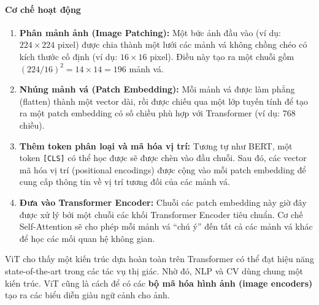 \paragraph{Cơ chế hoạt động}
\begin{enumerate}
    \item \textbf{Phân mảnh ảnh (Image Patching):} Một bức ảnh đầu vào (ví dụ: $224 \times 224$ pixel) được chia thành một lưới các mảnh vá không chồng chéo có kích thước cố định (ví dụ: $16 \times 16$ pixel). Điều này tạo ra một chuỗi gồm $(224/16)^2 = 14 \times 14 = 196$ mảnh vá.
    \item \textbf{Nhúng mảnh vá (Patch Embedding):} Mỗi mảnh vá được làm phẳng (flatten) thành một vector dài, rồi được chiếu qua một lớp tuyến tính để tạo ra một patch embedding có số chiều phù hợp với Transformer (ví dụ: 768 chiều).
    \item \textbf{Thêm token phân loại và mã hóa vị trí:} Tương tự như BERT, một token \texttt{[CLS]} có thể học được sẽ được chèn vào đầu chuỗi. Sau đó, các vector mã hóa vị trí (positional encodings) được cộng vào mỗi patch embedding để cung cấp thông tin về vị trí tương đối của các mảnh vá.
    \item \textbf{Đưa vào Transformer Encoder:} Chuỗi các patch embedding này giờ đây được xử lý bởi một chuỗi các khối Transformer Encoder tiêu chuẩn. Cơ chế Self-Attention sẽ cho phép mỗi mảnh vá “chú ý” đến tất cả các mảnh vá khác để học các mối quan hệ không gian.
\end{enumerate}

\begin{center}
    \label{fig:vision_transformer_vit}
\end{center}

ViT cho thấy một kiến trúc dựa hoàn toàn trên Transformer có thể đạt hiệu năng state-of-the-art trong các tác vụ thị giác. Nhờ đó, NLP và CV dùng chung một kiến trúc. ViT cũng là cách để có các \textbf{bộ mã hóa hình ảnh (image encoders)} tạo ra các biểu diễn giàu ngữ cảnh cho ảnh.

